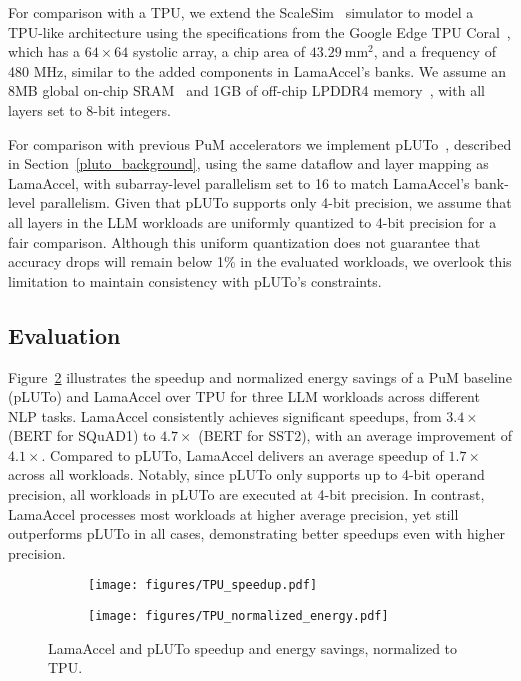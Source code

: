 For comparison with a TPU, we extend the ScaleSim~\cite{scale} simulator to model a TPU-like architecture using the specifications from the Google Edge TPU Coral~\cite{tpu-edge}, which has a $64 \times 64$ systolic array, a chip area of $43.29 \ \text{mm}^2$, and a frequency of 480 MHz, similar to the added components in LamaAccel's banks. We assume an 8MB global on-chip SRAM~\cite{tpu-edge-sram} and 1GB of off-chip LPDDR4 memory~\cite{tpu-edge-ddr4}, with all layers set to 8-bit integers.

For comparison with previous PuM accelerators we implement pLUTo~\cite{pluto}, described in Section~\ref{pluto_background}, using the same dataflow and layer mapping as LamaAccel, with subarray-level parallelism set to 16 to match LamaAccel's bank-level parallelism. Given that pLUTo supports only 4-bit precision, we assume that all layers in the LLM workloads are uniformly quantized to 4-bit precision for a fair comparison. Although this uniform quantization does not guarantee that accuracy drops will remain below 1\% in the evaluated workloads, we overlook this limitation to maintain consistency with pLUTo's constraints.

\subsection{Evaluation}
Figure~\ref{fig:case_study2_evaluation_tpu} illustrates the speedup and normalized energy savings of a PuM baseline (pLUTo) and LamaAccel over TPU for three LLM workloads across different NLP tasks. LamaAccel consistently achieves significant speedups, from $3.4\times$ (BERT for SQuAD1) to $4.7\times$ (BERT for SST2), with an average improvement of $4.1\times$. Compared to pLUTo, LamaAccel delivers an average speedup of $1.7\times$ across all workloads. Notably, since pLUTo only supports up to 4-bit operand precision, all workloads in pLUTo are executed at 4-bit precision. In contrast, LamaAccel processes most workloads at higher average precision, yet still outperforms pLUTo in all cases, demonstrating better speedups even with higher precision.

\begin{figure}
    \centering
    \begin{subfigure}{\columnwidth}
        \centering
        \texttt{[image: figures/TPU\_speedup.pdf]}
    \end{subfigure}
    \begin{subfigure}{\columnwidth}
        \centering
        \texttt{[image: figures/TPU\_normalized\_energy.pdf]}
        \label{fig:third}
    \end{subfigure}
    \caption{LamaAccel and pLUTo speedup and energy savings, normalized to TPU.}
    \vskip -0.20in
    \label{fig:case_study2_evaluation_tpu}
\end{figure}


